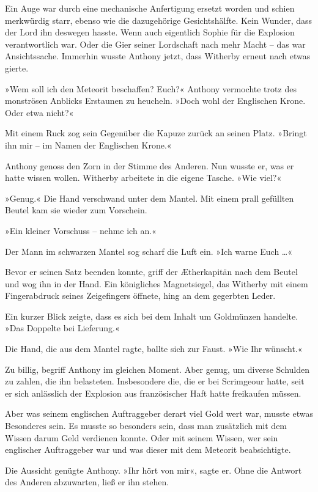 Ein Auge war durch eine mechanische Anfertigung ersetzt worden und
schien merkwürdig starr, ebenso wie die dazugehörige
Gesichtshälfte. Kein Wunder, dass der Lord ihn deswegen hasste.
Wenn auch eigentlich Sophie für die Explosion verantwortlich war.
Oder die Gier seiner Lordschaft nach mehr Macht – das war
Ansichtssache. Immerhin wusste Anthony jetzt, dass Witherby erneut
nach etwas gierte.

»Wem soll ich den Meteorit beschaffen? Euch?« Anthony vermochte
trotz des monströsen Anblicks Erstaunen zu heucheln. »Doch wohl der
Englischen Krone. Oder etwa nicht?«

Mit einem Ruck zog sein Gegenüber die Kapuze zurück an seinen
Platz. »Bringt ihn mir – im Namen der Englischen Krone.«

Anthony genoss den Zorn in der Stimme des Anderen. Nun wusste er,
was er hatte wissen wollen. Witherby arbeitete in die eigene
Tasche. »Wie viel?«

»Genug.« Die Hand verschwand unter dem Mantel. Mit einem prall
gefüllten Beutel kam sie wieder zum Vorschein.

»Ein kleiner Vorschuss – nehme ich an.«

Der Mann im schwarzen Mantel sog scharf die Luft ein. »Ich warne
Euch …«

Bevor er seinen Satz beenden konnte, griff der Ætherkapitän nach
dem Beutel und wog ihn in der Hand. Ein königliches Magnetsiegel,
das Witherby mit einem Fingerabdruck seines Zeigefingers öffnete,
hing an dem gegerbten Leder.

Ein kurzer Blick zeigte, dass es sich bei dem Inhalt um Goldmünzen
handelte. »Das Doppelte bei Lieferung.«

Die Hand, die aus dem Mantel ragte, ballte sich zur Faust. »Wie Ihr
wünscht.«

Zu billig, begriff Anthony im gleichen Moment. Aber genug, um
diverse Schulden zu zahlen, die ihn belasteten. Insbesondere die,
die er bei Scrimgeour hatte, seit er sich anlässlich der Explosion
aus französischer Haft hatte freikaufen müssen.

Aber was seinem englischen Auftraggeber derart viel Gold wert war,
musste etwas Besonderes sein. Es musste so besonders sein, dass man
zusätzlich mit dem Wissen darum Geld verdienen konnte. Oder mit
seinem Wissen, wer sein englischer Auftraggeber war und was dieser
mit dem Meteorit beabsichtigte.

Die Aussicht genügte Anthony. »Ihr hört von mir«, sagte er. Ohne
die Antwort des Anderen abzuwarten, ließ er ihn stehen.

